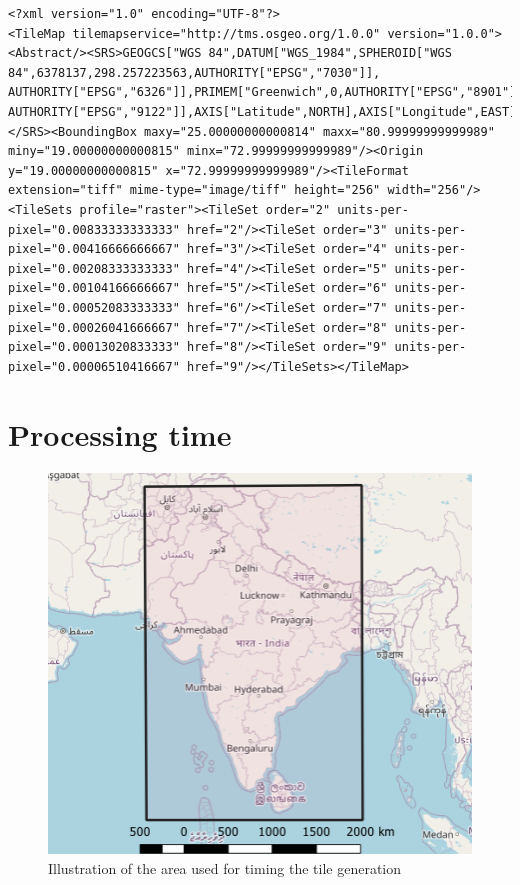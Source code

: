 \begin{lstlisting}[language=HTML5, caption={The metadata from the xml file generated by the modified gdal2tiles}, label= VoresHTML,escapechar=|]
<?xml version="1.0" encoding="UTF-8"?>
<TileMap tilemapservice="http://tms.osgeo.org/1.0.0" version="1.0.0"><Abstract/><SRS>GEOGCS["WGS 84",DATUM["WGS_1984",SPHEROID["WGS 84",6378137,298.257223563,AUTHORITY["EPSG","7030"]],
AUTHORITY["EPSG","6326"]],PRIMEM["Greenwich",0,AUTHORITY["EPSG","8901"]],UNIT["degree",0.0174532925199433,
AUTHORITY["EPSG","9122"]],AXIS["Latitude",NORTH],AXIS["Longitude",EAST],AUTHORITY["EPSG","4326"]]
</SRS><BoundingBox maxy="25.00000000000814" maxx="80.99999999999989" miny="19.00000000000815" minx="72.99999999999989"/><Origin y="19.00000000000815" x="72.99999999999989"/><TileFormat extension="tiff" mime-type="image/tiff" height="256" width="256"/><TileSets profile="raster"><TileSet order="2" units-per-pixel="0.00833333333333" href="2"/><TileSet order="3" units-per-pixel="0.00416666666667" href="3"/><TileSet order="4" units-per-pixel="0.00208333333333" href="4"/><TileSet order="5" units-per-pixel="0.00104166666667" href="5"/><TileSet order="6" units-per-pixel="0.00052083333333" href="6"/><TileSet order="7" units-per-pixel="0.00026041666667" href="7"/><TileSet order="8" units-per-pixel="0.00013020833333" href="8"/><TileSet order="9" units-per-pixel="0.00006510416667" href="9"/></TileSets></TileMap>
\end{lstlisting}

\section{Processing time}

\begin{figure} [H]
	\centering
	\includegraphics[width=.8\textwidth]{Pictures/ProcessingTime}
	\caption{Illustration of the area used for timing the tile generation}
	\label{ProcessingTime}
\end{figure}

